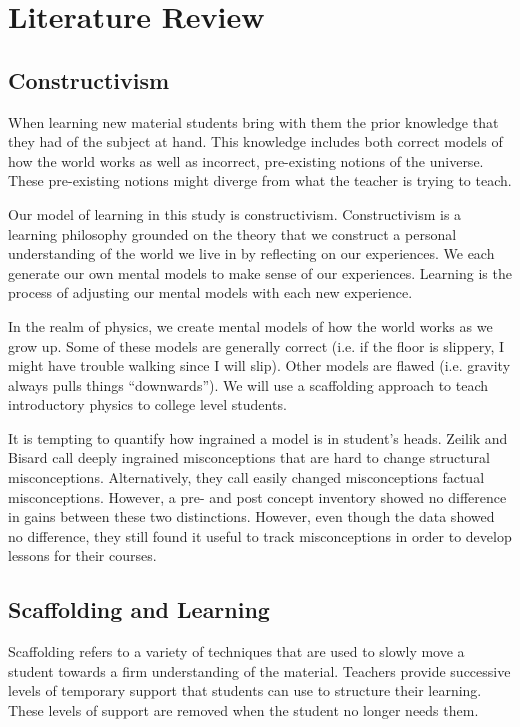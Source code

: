 \chapter[Chapter 2: Literature Review]{Literature Review}

\section{Constructivism}

When learning new material students bring with them the prior knowledge that they had of the subject at hand. This knowledge includes both correct models of how the world works as well as incorrect, pre-existing notions of the universe. These pre-existing notions might diverge from what the teacher is trying to teach.

Our model of learning in this study is constructivism. Constructivism is a learning philosophy grounded on the theory that we construct a personal understanding of the world we live in by reflecting on our experiences. We each generate our own mental models to make sense of our experiences. Learning is the process of adjusting our mental models with each new experience.

In the realm of physics, we create mental models of how the world works as we grow up. Some of these models are generally correct (i.e. if the floor is slippery, I might have trouble walking since I will slip). Other models are flawed (i.e. gravity always pulls things “downwards”). We will use a scaffolding approach to teach introductory physics to college level students.

It is tempting to quantify how ingrained a model is in student's heads. Zeilik and Bisard call deeply ingrained misconceptions that are hard to change structural misconceptions. Alternatively, they call easily changed misconceptions factual misconceptions\cite{zeilik2000}. However, a pre- and post concept inventory showed no difference in gains between these two distinctions. However, even though the data showed no difference, they still found it useful to track misconceptions in order to develop lessons for their courses.

\section{Scaffolding and Learning}

Scaffolding refers to a variety of techniques that are used to slowly move a student towards a firm understanding of the material. Teachers provide successive levels of temporary support that students can use to structure their learning. These levels of support are removed when the student no longer needs them.

